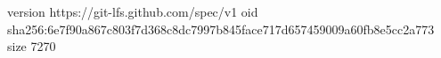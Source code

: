version https://git-lfs.github.com/spec/v1
oid sha256:6e7f90a867c803f7d368c8dc7997b845face717d657459009a60fb8e5cc2a773
size 7270
